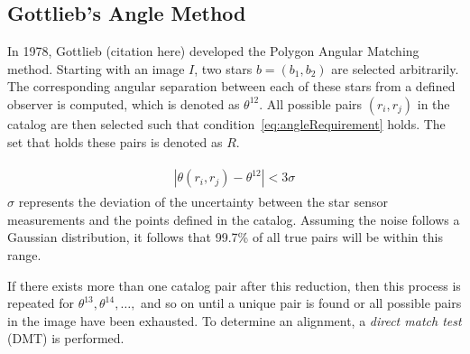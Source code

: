 
\subsection{Gottlieb's Angle Method}\label{subsec:gottlieb'sAngleMethod}
In 1978, Gottlieb (citation here) developed the Polygon Angular Matching method. Starting with an image $I$, two stars
$b = (b_1, b_2)$ are selected arbitrarily. The corresponding angular separation between each of these stars from a
defined observer is computed, which is denoted as $\theta^{12}$. All possible pairs $(r_i, r_j)$ in the catalog are then
selected such that condition~\eqref{eq:angleRequirement} holds. The set that holds these pairs is denoted as $R$.

\begin{align}
    \label{eq:angleRequirement}
    \begin{split}
        | \theta(r_i, r_j) - \theta^{12} | < 3 \sigma
    \end{split}
\end{align}
$\sigma$ represents the deviation of the uncertainty between the star sensor measurements and the points defined in the
catalog. Assuming the noise follows a Gaussian distribution, it follows that 99.7\% of all true pairs will be within
this range.

If there exists more than one catalog pair after this reduction, then this process is repeated for
$\theta^{13}, \theta^{14}, \dots,$ and so on until a unique pair is found or all possible pairs in the image
have been exhausted. To determine an alignment, a \textit{direct match test} (DMT) is performed.

